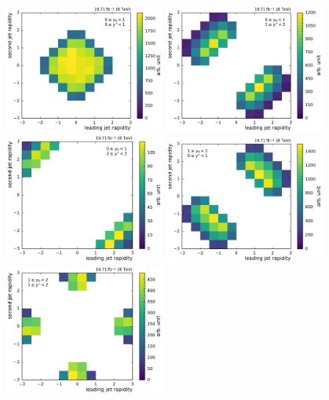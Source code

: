 \begin{figure}[htbp]
    \centering
    \includegraphics[width=0.47\textwidth]{figures/measurement/jet12_rapidity_yb0ys0.pdf}\hfill
    \includegraphics[width=0.47\textwidth]{figures/measurement/jet12_rapidity_yb0ys1.pdf}
    \includegraphics[width=0.47\textwidth]{figures/measurement/jet12_rapidity_yb0ys2.pdf}\hfill
    \includegraphics[width=0.47\textwidth]{figures/measurement/jet12_rapidity_yb1ys0.pdf}
    \includegraphics[width=0.47\textwidth]{figures/measurement/jet12_rapidity_yb1ys1.pdf}\hfill

\end{figure}
